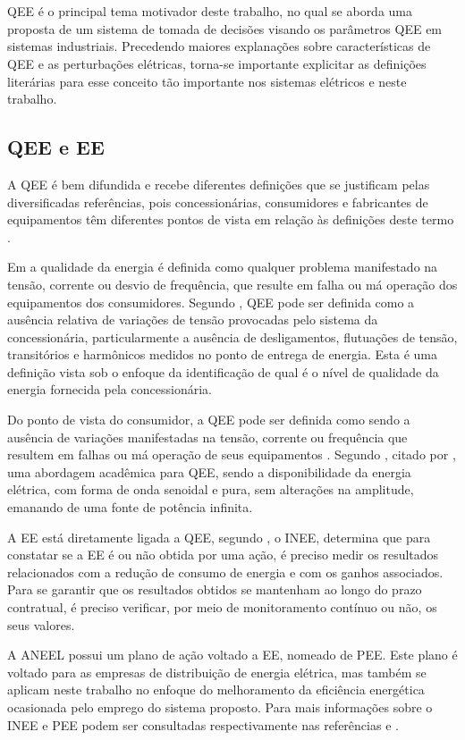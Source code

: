 \chapter{\capdois}\label{qeeDIS}
\acl{QEE} é o principal tema motivador deste trabalho, no qual se aborda uma proposta de um sistema de tomada de decisões visando os parâmetros \ac{QEE} em sistemas industriais. Precedendo maiores explanações sobre características de \ac{QEE} e as perturbações elétricas, torna-se importante explicitar as definições literárias para esse conceito tão importante nos sistemas elétricos e neste trabalho.

\section{QEE e EE}\label{qeeEE}
\par 
A \ac{QEE} é bem difundida e recebe diferentes definições que se justificam pelas diversificadas referências, pois concessionárias, consumidores e fabricantes de equipamentos têm diferentes pontos de vista em relação às definições deste termo \citep{FER99}.
\par 
Em \cite{DUG96} a qualidade da energia é definida como qualquer problema manifestado na tensão, corrente ou desvio de frequência, que resulte em falha ou má operação dos equipamentos dos consumidores. Segundo \cite{FER99}, \ac{QEE} pode ser definida como a ausência relativa de variações de tensão provocadas pelo sistema da concessionária, particularmente a ausência de desligamentos, flutuações de tensão, transitórios e harmônicos medidos no ponto de entrega de energia. Esta é uma definição vista sob o enfoque da identificação de qual é o nível de qualidade da energia fornecida pela concessionária.
\par
Do ponto de vista do consumidor, a \ac{QEE} pode ser definida como sendo a ausência de variações manifestadas na tensão, corrente ou frequência que resultem em falhas ou má operação de seus equipamentos \citep{DUG96}.
Segundo \cite{SBQEE}, citado por \cite{FER99}, uma abordagem acadêmica para \ac{QEE}, sendo a disponibilidade da energia elétrica, com forma de onda senoidal e pura, sem alterações na amplitude, emanando de uma fonte de potência infinita. 
\par 
A \acl{EE} está diretamente ligada a \ac{QEE}, segundo \cite{INE12}, o \ac{INEE}, determina que para constatar se a \ac{EE} é ou não obtida por uma ação, é preciso medir os resultados relacionados com a redução de consumo de energia e com os ganhos associados. Para se garantir que os resultados obtidos se mantenham ao longo do prazo contratual, é preciso verificar, por meio de monitoramento contínuo ou não, os seus valores.
\par
A \ac{ANEEL} possui um plano de ação voltado a \ac{EE}, nomeado de \ac{PEE}. Este plano é voltado para as empresas de distribuição de energia elétrica, mas também se aplicam neste trabalho no enfoque do melhoramento da eficiência energética ocasionada pelo emprego do sistema proposto. Para mais informações sobre o \ac{INEE} e \ac{PEE} podem ser consultadas respectivamente nas referências \citep{INE12} e \citep{ANEE3}.

